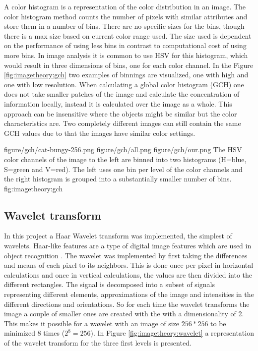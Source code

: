 A color histogram is a representation of the color distribution in an image. The color histogram method counts the number of pixels with similar attributes and store them in a number of bins. There are no specific sizes for the bins, though there is a max size based on current color range used. The size used is dependent on the performance of using less bins in contrast to computational cost of using more bins. In image analysis it is common to use HSV for this histogram, which would result in three dimensions of bins, one for each color channel. In the Figure \ref{fig:imagetheory:gch} two examples of binnings are visualized, one with high and one with low resolution. When calculating a global color histogram (GCH) one does not take smaller patches of the image and calculate the concentration of information locally, instead it is calculated over the image as a whole. This approach can be insensitive where the objects might be similar but the color characteristics are. Two completely different images can still contain the same GCH values due to that the images have similar color settings.

\threefigure
{figure/gch/cat-bungy-256.png}
{figure/gch/all.png}
{figure/gch/our.png}
{The HSV color channels of the image to the left are binned into two histograms (H=blue, S=green and V=red). The left uses one bin per level of the color channels and the right histogram is grouped into a substantially smaller number of bins.}
{fig:imagetheory:gch} 

\subsection{Wavelet transform}
\label{sec:wlt_feature}

In this project a Haar Wavelet transform was implemented, the simplest of wavelets. Haar-like features are a type of digital image features which are used in object recognition \cite{pavani2010haar}. The wavelet was implemented by first taking the differences and means of each pixel to its neighbors. This is done once per pixel in horizontal calculations and once in vertical calculations, the values are then divided into the different rectangles. The signal is decomposed into a subset of signals representing different elements, approximations of the image and intensities in the different directions and orientations. So for each time the wavelet transforms the image a couple of smaller ones are created with the with a dimensionality of 2. This makes it possible for a wavelet with an image of size $256*256$ to be minimized 8 times ($2^8 = 256$). In Figure \ref{fig:imagetheory:wavelet} a representation of the wavelet transform for the three first levels is presented.

